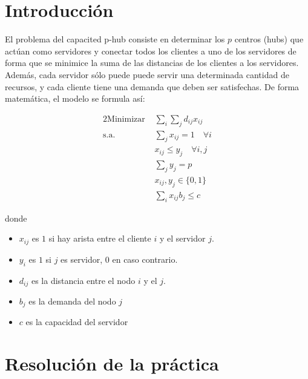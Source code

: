 \documentclass[11pt,a4paper,twoside,openright,titlepage,final]{article}
\author{José Ignacio Escribano}
\begin{document}
\setcounter{page}{1}


\listoftables
\thispagestyle{empty}
\newpage

\tableofcontents
\thispagestyle{empty}
\newpage


\setcounter{page}{1}

\section{Introducción}

El problema del capacited p-hub consiste en determinar los $p$ centros (hubs) que actúan como servidores y conectar todos los clientes a uno de los servidores de forma que se minimice la suma de las distancias de los clientes a los servidores. Además, cada servidor sólo puede puede servir una determinada cantidad de recursos, y cada cliente tiene una demanda que deben ser satisfechas. De forma matemática, el modelo se formula así:

\begin{alignat*}{2}
\text{Minimizar }   & \sum_{i} \sum_{j} d_{ij}x_{ij}  \\
\text{s.a. } &  \sum_{j} x_{ij} = 1 \quad \forall i\\
&  x_{ij} \leq y_j \quad \forall i,j\\
& \sum_{j} y_j = p \\
& x_{ij}, y_j \in \{0,1\} \\
& \sum_{i} x_{ij} b_j \leq c
\end{alignat*}

donde

\begin{itemize}
	\item $x_{ij}$ es $1$ si hay arista entre el cliente $i$ y el servidor $j$.
	\item $y_i$ es $1$  si $j$ es servidor, $0$ en caso contrario.
	\item $d_{ij}$ es la distancia entre el nodo $i$ y el $j$.
	\item $b_j$ es la demanda del nodo $j$
	\item $c$ es la capacidad del servidor
\end{itemize}

\section{Resolución de la práctica}
\end{document}
